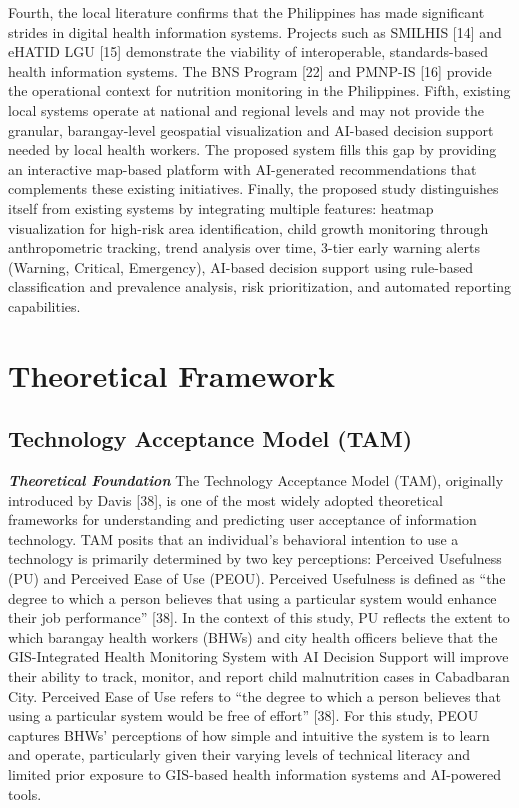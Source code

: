 \documentclass[12pt, a4paper]{report}
\begin{document}
Fourth, the local literature confirms that the Philippines has made significant strides in digital health information systems. Projects such as SMILHIS [14] and eHATID LGU [15] demonstrate the viability of interoperable, standards-based health information systems. The BNS Program [22] and PMNP-IS [16] provide the operational context for nutrition monitoring in the Philippines.
Fifth, existing local systems operate at national and regional levels and may not provide the granular, barangay-level geospatial visualization and AI-based decision support needed by local health workers. The proposed system fills this gap by providing an interactive map-based platform with AI-generated recommendations that complements these existing initiatives.
Finally, the proposed study distinguishes itself from existing systems by integrating multiple features: heatmap visualization for high-risk area identification, child growth monitoring through anthropometric tracking, trend analysis over time, 3-tier early warning alerts (Warning, Critical, Emergency), AI-based decision support using rule-based classification and prevalence analysis, risk prioritization, and automated reporting capabilities.

\section{Theoretical Framework}
\label{sec:theoretical}

\subsection{Technology Acceptance Model (TAM)}
\label{sec:tam}

\noindent \textbf{\textit{Theoretical Foundation}}
The Technology Acceptance Model (TAM), originally introduced by Davis [38], is one of the most widely adopted theoretical frameworks for understanding and predicting user acceptance of information technology. TAM posits that an individual's behavioral intention to use a technology is primarily determined by two key perceptions: Perceived Usefulness (PU) and Perceived Ease of Use (PEOU).
Perceived Usefulness is defined as ``the degree to which a person believes that using a particular system would enhance their job performance'' [38]. In the context of this study, PU reflects the extent to which barangay health workers (BHWs) and city health officers believe that the GIS-Integrated Health Monitoring System with AI Decision Support will improve their ability to track, monitor, and report child malnutrition cases in Cabadbaran City.
Perceived Ease of Use refers to ``the degree to which a person believes that using a particular system would be free of effort'' [38]. For this study, PEOU captures BHWs' perceptions of how simple and intuitive the system is to learn and operate, particularly given their varying levels of technical literacy and limited prior exposure to GIS-based health information systems and AI-powered tools.
\end{document}
